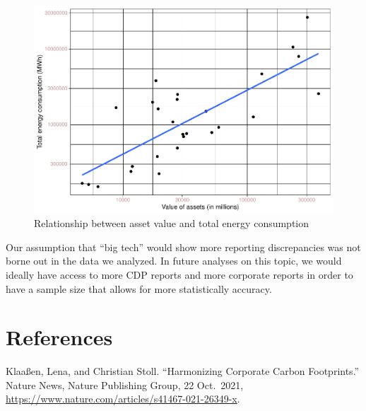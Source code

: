 \documentclass[
  12pt,
]{article}
\begin{document}
\begin{figure}
\centering
\includegraphics{BoothProphete_Report_files/figure-latex/plot1-1.pdf}
\caption{Relationship between asset value and total energy consumption}
\end{figure}

Our assumption that ``big tech'' would show more reporting discrepancies
was not borne out in the data we analyzed. In future analyses on this
topic, we would ideally have access to more CDP reports and more
corporate reports in order to have a sample size that allows for more
statistically accuracy.

\newpage

\hypertarget{references}{%
\section{References}\label{references}}

Klaaßen, Lena, and Christian Stoll. ``Harmonizing Corporate Carbon
Footprints.'' Nature News, Nature Publishing Group, 22 Oct.~2021,
\url{https://www.nature.com/articles/s41467-021-26349-x}.
\end{document}
